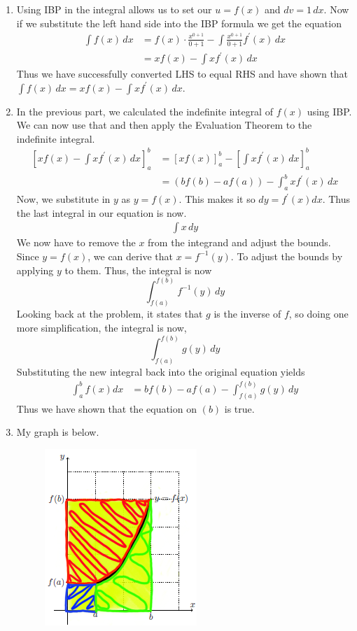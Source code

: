 \documentclass{article}
\begin{document}
\begin{enumerate}[label=\textbf{(4.\arabic*)}]
\begin{enumerate}
    \item Using IBP in the integral allows us to set our $u=f(x)$ and $dv=1\, dx$. Now if we substitute the left hand side into the IBP formula we get the equation
    \begin{align*}
        \int\!f(x)\, dx &=f(x)\cdot\frac{x^{0+1}}{0+1}-\int\!\frac{x^{0+1}}{0+1}f^\prime(x)\, dx \\
        &= xf(x)-\int\!xf^\prime(x)\, dx
    \end{align*}
    Thus we have successfully converted LHS to equal RHS and have shown that $\displaystyle{\int\!f(x)\,dx=xf(x)-\int\!xf^\prime(x)\,dx}$.
    \item In the previous part, we calculated the indefinite integral of $f(x)$ using IBP. We can now use that and then apply the Evaluation Theorem to the indefinite integral.
    \begin{align*}
        \left[xf(x)-\int\!xf^\prime(x)\, dx\right]_a^b &= \left[xf(x)\right]_a^b-\left[\int\!xf^\prime(x)\, dx\right]_a^b \\
        &=\left(bf(b)-af(a)\right)-\int_a^b\!xf^\prime(x)\, dx
    \end{align*} 
    Now, we substitute in $y$ as $y=f(x)$. This makes it so $dy=f^\prime(x)dx$. Thus the last integral in our equation is now.
    \begin{align*}
        \int\!x\,dy
    \end{align*}
    We now have to remove the $x$ from the integrand and adjust the bounds. Since $y=f(x)$, we can derive that $x=f^{-1}(y)$. To adjust the bounds by applying $y$ to them. Thus, the integral is now
    \[\int_{f(a)}^{f(b)}\!f^{-1}(y)\,dy\]
    Looking back at the problem, it states that $g$ is the inverse of $f$, so doing one more simplification, the integral is now,
    \[\int_{f(a)}^{f(b)}\!g(y)\,dy\]
    Substituting the new integral back into the original equation yields
    \begin{align*}
        \int_a^b\!f(x)dx&=bf(b)-af(a)-\int_{f(a)}^{f(b)}\!g(y)\,dy
    \end{align*}
    Thus we have shown that the equation on $(b)$ is true.
    \item My graph is below.
    \begin{figure}[H]
        \centering
        \includegraphics{highlighter.png}

\end{figure}
\end{enumerate}
\end{enumerate}
\end{document}
